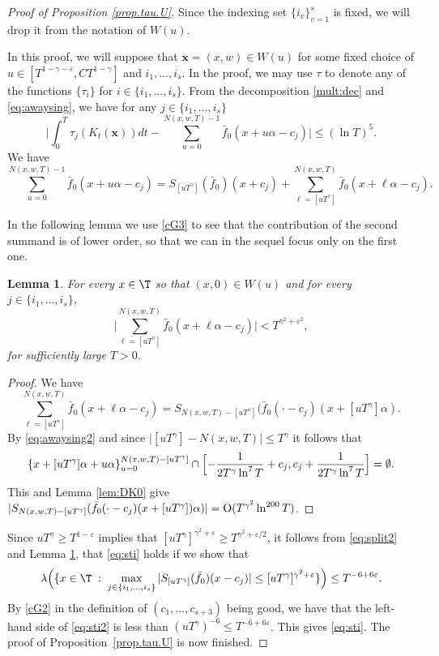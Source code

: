 \documentclass[JEP,XML,SOM,Unicode,NoFloatCountersInSection]{cedram}
\let\DS\relax
\newcommand\bx{\boldsymbol{x}}
\let\eps\varepsilon
\theoremstyle{definition}
\theoremstyle{plain}
\newtheorem{lemma}[definition]{Lemma}
\begin{document}
\begin{proof}[Proof of Proposition \ref{prop.tau.U}]
Since the indexing set $\{i_v\}_{v=1}^s$ is fixed, we will drop it from the notation of $W(u)$.

In this proof, we will suppose that $\bx=(x,w)\in W(u)$ for some fixed choice of $u\in [T^{1-\gamma-\eps},CT^{1-\gamma}]$ and $i_1,\ldots,i_s$.
In the proof, we may use $\tau$ to denote any of the functions $\{\tau_i\}$ for $i\in \{i_1,\ldots,i_s\}$. From the decomposition \eqref{mult:dec} and \eqref{eq:awaysing}, we have for any $j \in \{i_1,\ldots,i_s\}$
\begin{equation*}%
\biggl|\int_{0}^T\tau_j(K_t(\bx))dt- \sum_{u=0}^{N(x,w,T)-1}\bar{f}_0(x+u\alpha-c_j) \biggr|\leq (\ln T)^5.
\end{equation*}
We have
\begin{equation}\label{eq:split2}
\sum_{u=0}^{N(x,w,T)-1}\bar{f}_0(x+u\alpha-c_j)=S_{[uT^\gamma]}(\bar{f}_0)(x+c_j)+
\sum^{{ N(x,w,T)}}_{{ \ell=[uT^\gamma]}}\bar{f}_0(x+\ell\alpha-c_j).
\end{equation}

In the following lemma we use \eqref{cG3} to see that the contribution of the second summand is of lower order, so that we can in the sequel focus only on the first one.
\begin{lemma}\label{lem:lowo} For every $x\in \T$ so that $ (x, 0)\in W(u)$ and for every $j\in \{i_1,\ldots, i_s\}$,
\[
\biggl |\sum_{\ell=[uT^\gamma]}^{N(x,w,T)}\bar{f}_0(x+\ell\alpha-c_j) \biggr |<T^{\gamma^2+\eps^2},
\]
for sufficiently large $T>0$.
\end{lemma}
\begin{proof}
We have
\[
\sum_{\ell=[uT^\gamma]}^{N(x,w,T)}\bar{f}_0(x+\ell\alpha-c_j)=S_{N(x,w,T)-[uT^\gamma]}(\bar{f}_0(\cdot-c_j)(x+[uT^\gamma]\alpha).
\]
By \eqref{eq:awaysing2} and since $\bigl|[uT^\gamma]-N(x,w,T)\bigr|\leq T^\gamma$ it follows that
\[
\left\{x+[uT^\gamma]\alpha+u\alpha\right\}_{u=0}^{N(x,w,T)-[uT^\gamma]}\cap
\Bigl[-\frac{1}{2T^\gamma\ln^{7}T}+ c_j, c_j+\frac{1}{2T^\gamma\ln^{7}T}\Bigr]=\emptyset.
\]
This and Lemma \ref{lem:DK0} give
$\DS
|S_{N(x,w,T)-[uT^\gamma]}(\bar{f}_0(\cdot-c_j)(x+[uT^\gamma])\alpha)|={\rm O} (T^{\gamma^2}\ln^{200}T)$.
\end{proof}

Since $uT^\gamma \geq T^{1-\eps}$ implies that $[uT^\gamma]^{\gamma^2+\eps}\geq T^{\gamma^2+\eps/2}$, it follows from \eqref{eq:split2} and Lemma \ref{lem:lowo}, that \eqref{eq:sti} holds if we show that
\begin{equation}\label{eq:sti2}
\lambda\Big(\{x\in \T\;:\; \max_{j \in \{i_1,\ldots,i_s\}} |S_{[uT^\gamma]}(\bar{f}_0)(x-c_j)|\leq [uT^\gamma]^{\gamma^2+\eps}\}\Big)\leq T^{-6+6\eps}.
\end{equation}
By \eqref{cG2} in the definition of $(c_{1},\ldots, c_{s+3})$ being good, we have that the left-hand side of \eqref{eq:sti2} is less than $ (uT^\gamma)^{-6}\leq T^{-6+6\eps}$. This gives \eqref{eq:sti}. The proof of Proposition~\ref{prop.tau.U} is now finished.
\end{proof}
\end{document}
